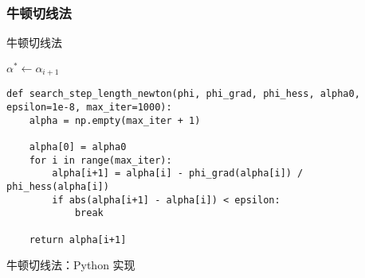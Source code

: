 \documentclass[cn]{elegantpaper}
\begin{document}
\subsubsection{牛顿切线法}

\begin{algorithm}[H]
    \caption{牛顿切线法}
    $\alpha^{*}\leftarrow\alpha_{i+1}$\;
\end{algorithm}

\begin{listing}[H]
    \begin{verbatim}
def search_step_length_newton(phi, phi_grad, phi_hess, alpha0, epsilon=1e-8, max_iter=1000):
    alpha = np.empty(max_iter + 1)

    alpha[0] = alpha0
    for i in range(max_iter):
        alpha[i+1] = alpha[i] - phi_grad(alpha[i]) / phi_hess(alpha[i])
        if abs(alpha[i+1] - alpha[i]) < epsilon:
            break
    
    return alpha[i+1]
    \end{verbatim}
    \caption{牛顿切线法：Python 实现}
\end{listing}
\end{document}
